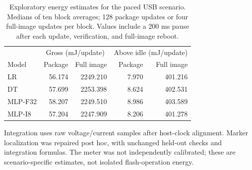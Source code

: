 \begin{table}[!htbp]
\caption{Exploratory energy estimates for the paced USB scenario. Medians of ten block averages; 128 package updates or four full-image updates per block. Values include a 200 ms pause after each update, verification, and full-image reboot.}\label{tab:energy}
\centering\small
\begin{tabular}{lrrrr}
\toprule & \multicolumn{2}{c}{Gross (mJ/update)} & \multicolumn{2}{c}{Above idle (mJ/update)}\\
Model & Package & Full image & Package & Full image\\\midrule
LR & 56.174 & 2249.210 & 7.970 & 401.216\\
DT & 57.699 & 2253.398 & 8.624 & 402.531\\
MLP-F32 & 58.207 & 2249.510 & 8.986 & 403.589\\
MLP-I8 & 57.204 & 2247.909 & 8.206 & 401.278\\
\bottomrule\end{tabular}
\par\smallskip\footnotesize Integration uses raw voltage/current samples after host-clock alignment. Marker localization was repaired post hoc, with unchanged held-out checks and integration formulas. The meter was not independently calibrated; these are scenario-specific estimates, not isolated flash-operation energy.
\end{table}
